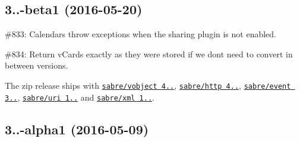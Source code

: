 \subsection*{3..-\/beta1 (2016-\/05-\/20) }


\begin{DoxyItemize}
\item \#833\+: Calendars throw exceptions when the sharing plugin is not enabled.
\item \#834\+: Return v\+Cards exactly as they were stored if we don\textquotesingle{}t need to convert in between versions.
\item The zip release ships with \href{http://sabre.io/vobject/}{\tt sabre/vobject 4..}, \href{http://sabre.io/http/}{\tt sabre/http 4..}, \href{http://sabre.io/event/}{\tt sabre/event 3..}, \href{http://sabre.io/uri/}{\tt sabre/uri 1..} and \href{http://sabre.io/xml/}{\tt sabre/xml 1..}.
\end{DoxyItemize}

\subsection*{3..-\/alpha1 (2016-\/05-\/09) }


